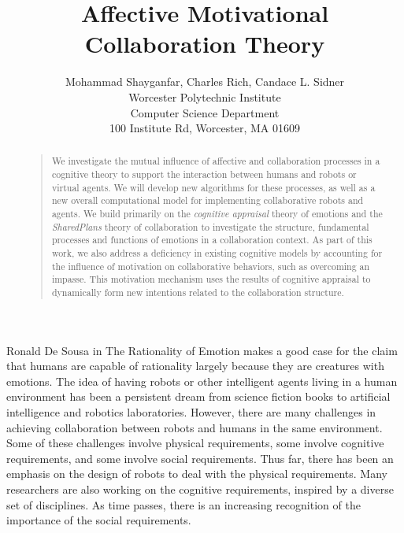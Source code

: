 \documentclass[letterpaper]{article}
\begin{document}
%
\title{Affective Motivational Collaboration Theory}
\author{Mohammad Shayganfar, Charles Rich, Candace L. Sidner\\
Worcester Polytechnic Institute\\
Computer Science Department\\
100 Institute Rd, Worcester, MA 01609\\
}
\maketitle
\begin{abstract}
\begin{quote}
We investigate the mutual influence of affective and collaboration processes in
a cognitive theory to support the interaction between humans and robots or
virtual agents. We will develop new algorithms for these processes, as well as a
new overall computational model for implementing collaborative robots and
agents. We build primarily on the \textit{cognitive appraisal} theory of
emotions \cite{gratch:domain-independent} and the \textit{SharedPlans} theory
\cite{grosz:plans-discourse} of collaboration to investigate the structure,
fundamental processes and functions of emotions in a collaboration context. As
part of this work, we also address a deficiency in existing cognitive models by
accounting for the influence of motivation on collaborative behaviors, such as
overcoming an impasse. This motivation mechanism uses the results of cognitive
appraisal to dynamically form new intentions related to the collaboration
structure.
\end{quote}
\end{abstract}

\noindent Ronald De Sousa in The Rationality of Emotion
\cite{sousa:rationality-emotion} makes a good case for the claim that humans are
capable of rationality largely because they are creatures with emotions. The
idea of having robots or other intelligent agents living in a human environment
has been a persistent dream from science fiction books to artificial
intelligence and robotics laboratories. However, there are many challenges in
achieving collaboration between robots and humans in the same environment. Some
of these challenges involve physical requirements, some involve cognitive
requirements, and some involve social requirements. Thus far, there has been an
emphasis on the design of robots to deal with the physical requirements. Many
researchers are also working on the cognitive requirements, inspired by a
diverse set of disciplines. As time passes, there is an increasing recognition
of the importance of the social requirements.
\end{document}
